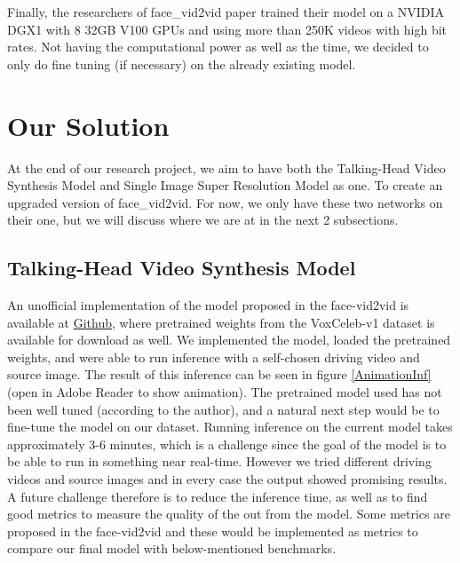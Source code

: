 \documentclass[twocolumn,10pt]{asme2ej}
\begin{document}
Finally, the researchers of face\_vid2vid paper trained their model on a NVIDIA DGX1 with 8 32GB V100 GPUs and using more than 250K videos with high bit rates. Not having the computational power as well as the time, we decided to only do fine tuning (if necessary) on the already existing model.

\section{Our Solution\protect\footnotemark}

At the end of our research project, we aim to have both the Talking-Head Video Synthesis Model and Single Image Super Resolution Model as one. To create an upgraded version of face\_vid2vid.
For now, we only have these two networks on their one, but we will discuss where we are at in the next 2 subsections.

\subsection{Talking-Head Video Synthesis Model}
An unofficial implementation of the model proposed in the face-vid2vid is available at  \href{https://github.com/zhanglonghao1992/One-Shot_Free-View_Neural_Talking_Head_Synthesis?ref=pythonrepo.com}{Github}, where pretrained weights from the VoxCeleb-v1 dataset is available for download as well. We implemented the model, loaded the pretrained weights, and were able to run inference with a self-chosen driving video and source image. The result of this inference can be seen in figure \ref{AnimationInf} (open in Adobe Reader to show animation). The pretrained model used has not been well tuned (according to the author), and a natural next step would be to fine-tune the model on our dataset. Running inference on the current model takes approximately 3-6 minutes, which is a challenge since the goal of the model is to be able to run in something near real-time. However we tried different driving videos and source images and in every case the output showed promising results. A future challenge therefore is to reduce the inference time, as well as to find good metrics to measure the quality of the out from the model. Some metrics are proposed in the face-vid2vid and these would be implemented as metrics to compare our final model with below-mentioned benchmarks.    
\end{document}
